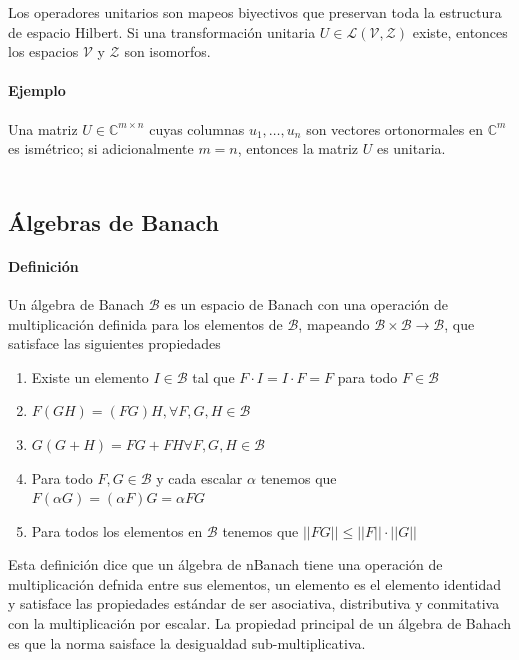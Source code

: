 Los operadores unitarios son mapeos biyectivos que preservan toda la estructura de espacio Hilbert. Si una transformación unitaria $U \in \mathcal{L} ( \mathcal{V} , \mathcal{Z} ) $ existe, entonces los espacios $\mathcal{V}$ y $\mathcal{Z}$ son isomorfos. \\

\paragraph{Ejemplo} Una matriz $U \in \mathbb{C}^{m \times n}$ cuyas columnas $u_1,\dots , u_n$ son vectores ortonormales en $\mathbb{C}^{m}$ es ismétrico; si adicionalmente $m = n$, entonces la matriz $U$ es unitaria. \\\

\subsection{Álgebras de Banach}

\paragraph{Definición} Un álgebra de Banach $\mathcal{B}$ es un espacio de Banach con una operación de multiplicación definida para los elementos de $\mathcal{B}$, mapeando $\mathcal{B} \times \mathcal{B} \to \mathcal{B}$, que satisface las siguientes propiedades

\begin{enumerate}
    \item Existe un elemento $I \in \mathcal{B}$ tal que $F \cdot I = I \cdot F = F$ para todo $F \in \mathcal{B}$
    \item $F(GH) = (FG)H, \forall F,G,H \in \mathcal{B}$
    \item $G(G+H) = FG + FH \forall F,G,H \in \mathcal{B}$
    \item Para todo $ F,G \in \mathcal{B}$ y cada escalar $\alpha$ tenemos que $ F ( \alpha G) =  (\alpha F) G = \alpha F G  $ 
    \item Para todos los elementos en $\mathcal{B}$ tenemos que $||FG|| \leq ||F|| \cdot ||G||$
\end{enumerate}

Esta definición dice que un álgebra de nBanach tiene una operación de multiplicación defnida entre sus elementos, un elemento es el elemento identidad y satisface las propiedades estándar de ser asociativa, distributiva y conmitativa con la multiplicación por escalar. La propiedad principal de un álgebra de Bahach es que la norma saisface la desigualdad sub-multiplicativa. \\

